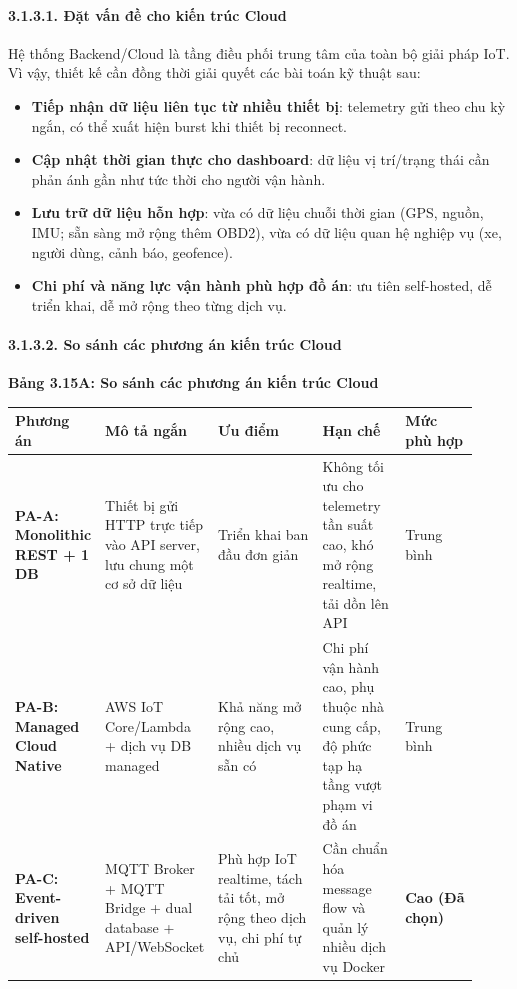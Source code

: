 \documentclass[13pt,a4paper]{extarticle}
\newcounter{none} %
\newcommand{\thesislongtableorignewline}{}
\let\thesislongtableorignewline\\
\renewcommand{\\}{\thesislongtableorignewline\hline}%
\let\\\thesislongtableorignewline
\newcommand{\thesistabletitle}[1]{%
  \begin{center}\textbf{#1}\end{center}%
}
\providecommand{\tightlist}{%
  \setlength{\itemsep}{0pt}\setlength{\parskip}{0pt}}
\begin{document}
\paragraph{3.1.3.1. Đặt vấn đề cho kiến trúc
Cloud}\label{3131-ux111ux1eb7t-vux1ea5n-ux111ux1ec1-cho-kiux1ebfn-truxfac-cloud}

Hệ thống Backend/Cloud là tầng điều phối trung tâm của toàn bộ giải pháp
IoT. Vì vậy, thiết kế cần đồng thời giải quyết các bài toán kỹ thuật
sau:

\begin{itemize}
\tightlist
\item
  \textbf{Tiếp nhận dữ liệu liên tục từ nhiều thiết bị}: telemetry gửi
  theo chu kỳ ngắn, có thể xuất hiện burst khi thiết bị reconnect.
\item
  \textbf{Cập nhật thời gian thực cho dashboard}: dữ liệu vị trí/trạng
  thái cần phản ánh gần như tức thời cho người vận hành.
\item
  \textbf{Lưu trữ dữ liệu hỗn hợp}: vừa có dữ liệu chuỗi thời gian (GPS,
  nguồn, IMU; sẵn sàng mở rộng thêm OBD2), vừa có dữ liệu quan hệ nghiệp
  vụ (xe, người dùng, cảnh báo, geofence).
\item
  \textbf{Chi phí và năng lực vận hành phù hợp đồ án}: ưu tiên
  self-hosted, dễ triển khai, dễ mở rộng theo từng dịch vụ.
\end{itemize}

\paragraph{3.1.3.2. So sánh các phương án kiến trúc
Cloud}\label{3132-so-suxe1nh-cuxe1c-phux1b0ux1a1ng-uxe1n-kiux1ebfn-truxfac-cloud}

\thesistabletitle{Bảng 3.15A: So sánh các phương án kiến trúc Cloud}

{\def\LTcaptype{none} %
\begin{longtable}{|p{0.12\linewidth}|p{0.10\linewidth}|p{0.30\linewidth}|p{0.20\linewidth}|p{0.20\linewidth}|}
\hline \textbf{Phương án} & \textbf{Mô tả ngắn} & \textbf{Ưu điểm} & \textbf{Hạn chế} & \textbf{Mức phù hợp} \\
\hline
\endhead
\hline
\endlastfoot
\textbf{PA-A: Monolithic REST + 1 DB} & Thiết bị gửi HTTP trực tiếp vào
API server, lưu chung một cơ sở dữ liệu & Triển khai ban đầu đơn giản &
Không tối ưu cho telemetry tần suất cao, khó mở rộng realtime, tải dồn
lên API & Trung bình \\
\textbf{PA-B: Managed Cloud Native} & AWS IoT Core/Lambda + dịch vụ DB
managed & Khả năng mở rộng cao, nhiều dịch vụ sẵn có & Chi phí vận hành
cao, phụ thuộc nhà cung cấp, độ phức tạp hạ tầng vượt phạm vi đồ án &
Trung bình \\
\textbf{PA-C: Event-driven self-hosted} & MQTT Broker + MQTT Bridge +
dual database + API/WebSocket & Phù hợp IoT realtime, tách tải tốt, mở
rộng theo dịch vụ, chi phí tự chủ & Cần chuẩn hóa message flow và quản
lý nhiều dịch vụ Docker & \textbf{Cao (Đã chọn)} \\
\end{longtable}
}
\end{document}
